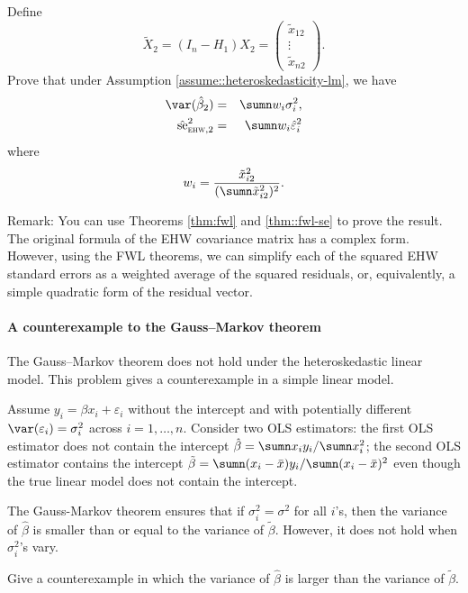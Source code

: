 Define 
$$
\tilde{X}_2 = (I_n - H_1) X_2 = \begin{pmatrix}
\tilde{x}_{12}\\
\vdots \\
\tilde{x}_{n2}
\end{pmatrix} . 
$$
Prove that under Assumption \ref{assume::heteroskedasticity-lm},  we have 
\begin{eqnarray*}
\var( \hat\beta_2  ) &=& \sumn  w_i \sigma_i^2,  \\
\hat{\text{se}}_{\textsc{ehw}, 2}^2  &=&  \sumn  w_i   \hat\varepsilon_i^2
\end{eqnarray*}
where 
$$
w_i = \frac{  \tilde{x}_{i2}^2  }{   ( \sumn    \tilde{x}_{i2}^2 )^2  } .
$$ 




Remark: You can use Theorems \ref{thm:fwl} and \ref{thm::fwl-se} to prove the result. 
The original formula of the EHW covariance matrix has a complex form. However, using the FWL theorems, we can simplify each of the squared EHW standard errors as a weighted average of the squared residuals, or, equivalently, a simple quadratic form of the residual vector. 



\paragraph{A counterexample to the Gauss--Markov theorem}\label{hw3::counterexample-gauss-markov-heteroskedasticity}


The Gauss--Markov theorem does not hold under the heteroskedastic linear model. This problem gives a counterexample in a simple linear model.


Assume $y_i = \beta x_i + \varepsilon_i$ without the intercept and with potentially different $\var(\varepsilon_i) = \sigma_i^2$ across $i=1,\ldots, n$. 
Consider two OLS estimators: the first OLS estimator does not contain the intercept $\hat{\beta} = \sumn x_i y_i / \sumn x_i^2$; the second OLS estimator contains the intercept $\tilde{\beta} =\sumn (x_i - \bar{x}) y_i / \sumn (x_i - \bar{x})^2 $ even though the true linear model does not contain the intercept. 


The Gauss-Markov theorem ensures that if $\sigma_i^2=\sigma^2$ for all $i$'s, then the variance of $\hat{\beta}$ is smaller than or equal to the variance of $\tilde{\beta} $. However, it does not hold when $\sigma_i^2$'s vary. 

Give a counterexample in which the variance of $\hat{\beta}$ is larger than the variance of $\tilde{\beta} $. 





